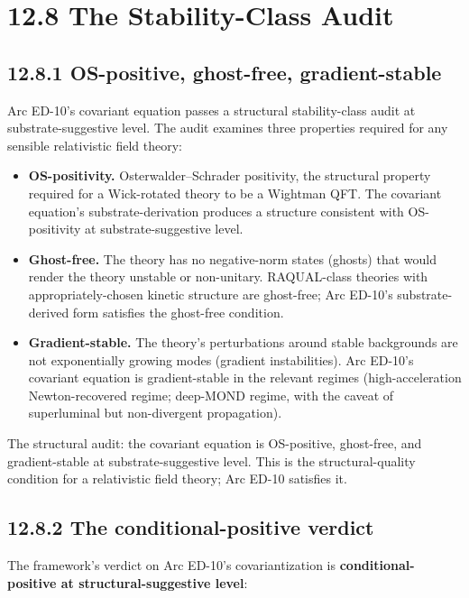 \documentclass[11pt]{book}
\begin{document}
\section{12.8 The Stability-Class Audit}

\subsection{12.8.1 OS-positive, ghost-free, gradient-stable}

Arc ED-10's covariant equation passes a structural stability-class audit at substrate-suggestive level. The audit examines three properties required for any sensible relativistic field theory:

\begin{itemize}
\item \textbf{OS-positivity.} Osterwalder–Schrader positivity, the structural property required for a Wick-rotated theory to be a Wightman QFT. The covariant equation's substrate-derivation produces a structure consistent with OS-positivity at substrate-suggestive level.
\item \textbf{Ghost-free.} The theory has no negative-norm states (ghosts) that would render the theory unstable or non-unitary. RAQUAL-class theories with appropriately-chosen kinetic structure are ghost-free; Arc ED-10's substrate-derived form satisfies the ghost-free condition.
\item \textbf{Gradient-stable.} The theory's perturbations around stable backgrounds are not exponentially growing modes (gradient instabilities). Arc ED-10's covariant equation is gradient-stable in the relevant regimes (high-acceleration Newton-recovered regime; deep-MOND regime, with the caveat of superluminal but non-divergent propagation).
\end{itemize}

The structural audit: the covariant equation is OS-positive, ghost-free, and gradient-stable at substrate-suggestive level. This is the structural-quality condition for a relativistic field theory; Arc ED-10 satisfies it.

\subsection{12.8.2 The conditional-positive verdict}

The framework's verdict on Arc ED-10's covariantization is \textbf{conditional-positive at structural-suggestive level}:
\end{document}
